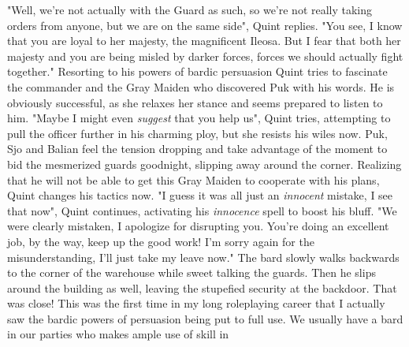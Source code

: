 "Well, we're not actually with the Guard as such, so we're not really taking orders from anyone, but we are on the same side", Quint replies. "You see, I know that you are loyal to her majesty, the magnificent Ileosa. But I fear that both her majesty and you are being misled by darker forces, forces we should actually fight together." Resorting to his powers of bardic persuasion Quint tries to fascinate the commander and the Gray Maiden who discovered Puk with his words. He is obviously successful, as she relaxes her stance and seems prepared to listen to him. "Maybe I might even {\itshape suggest} that you help us", Quint tries, attempting to pull the officer further in his charming ploy, but she resists his wiles now. Puk, Sjo and Balian feel the tension dropping and take advantage of the moment to bid the mesmerized guards goodnight, slipping away around the corner. Realizing that he will not be able to get this Gray Maiden to cooperate with his plans, Quint changes his tactics now. "I guess it was all just an {\itshape innocent} mistake, I see that now", Quint continues, activating his  {\itshape innocence} spell to boost his bluff. "We were clearly mistaken, I apologize for disrupting you. You're doing an excellent job, by the way, keep up the good work! I'm sorry again for the misunderstanding, I'll just take my leave now." The bard slowly walks backwards to the corner of the warehouse while sweet talking the guards. Then he slips around the building as well, leaving the stupefied security at the backdoor. That was close! This was the first time in my long roleplaying career that I actually saw the bardic powers of persuasion being put to full use. We usually have a bard in our parties who makes ample use of skill in 